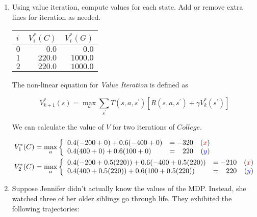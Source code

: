 \documentclass[12pt]{article}
\begin{document}
\begin{enumerate}

\item Using value iteration, compute values for each state.  Add or
  remove extra lines for iteration as needed.

\begin{center}
\begin{tabular}{|l|r|r|} \hline
$i$ & $V_i^*(C)$ & $V_i^*(G)$ \\ \hline
$0$ &$0.0$ &$0.0$ \\ 
$1$ & $220.0$ & $1000.0$\\ 
$2$ & $220.0$ & $1000.0$\\ 
\hline
\end{tabular}
\end{center}

The non-linear equation for {\em Value Iteration} is defined as

\[
  V^{*}_{k+1}(s) = \max_{a}\sum_{s^{\prime}}T(s, a, s^{\prime})\left[ R(s, a, s^{\prime}) + \gamma V^{*}_{k}(s^{\prime})\right]
\]

We can calculate the value of $V$ for two iterations of $College$.

\begin{align*}
V_{1}^{*}(C) &= \max_{a}\left\{ \begin{array}{lcr@{}}
                                  0.4(-200 + 0) + 0.6(-400 + 0) & = -320 & ({\color{red}{x}})\\
                                  0.4(400 + 0) + 0.6(100 + 0) & = \phantom{-}220 & ({\color{blue}{y}})\\
                                \end{array}\right.\\
V_{2}^{*}(C) &= \max_{a}\left\{ \begin{array}{lcr@{}}
                                  0.4(-200 + 0.5(220)) + 0.6(-400 + 0.5(220)) & = -210& ({\color{red}{x}})\\
                                  0.4(400 + 0.5(220)) + 0.6(100 + 0.5(220)) & = \phantom{-}220 & ({\color{blue}{y}})\\
                                \end{array}\right.
\end{align*}

\item Suppose Jennifer didn't actually know the values of the MDP.
  Instead, she watched three of her older siblings go through life.
  They exhibited the following trajectories:


\end{enumerate}
\end{document}
